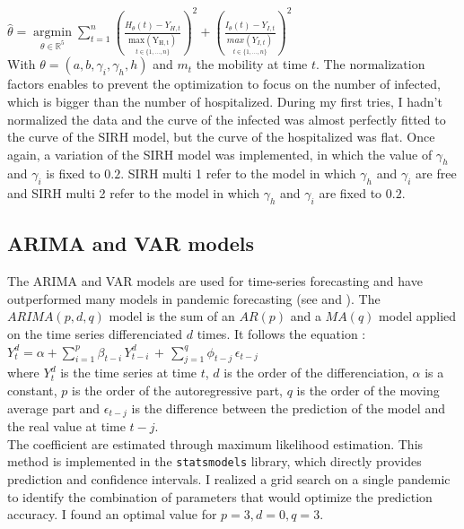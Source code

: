 $\hat{\theta} = \underset{\theta \in \mathbb{R}^5}{\operatorname{argmin}} \sum_{t=1}^{n} (\frac{H_\theta(t) - Y_{H, t}}{\underset{t \in \{1, ..., n \}}{\operatorname{max(Y_{H, t})}}})^2 + (\frac{I_\theta(t) - Y_{I, t}}{\underset{t \in \{1, ..., n \}}{max(Y_{I, t})}})^2$\\

With $\theta = (a, b, \gamma_i, \gamma_h, h)$ and $m_t$ the mobility at time $t$.
The normalization factors enables to prevent the optimization to focus on the number of infected, which is bigger than the number of hospitalized. 
During my first tries, I hadn't normalized the data and the curve of the infected was almost perfectly fitted to the curve of the SIRH model, but the curve of the hospitalized was flat. 
Once again, a variation of the SIRH model was implemented, in which the value of $\gamma_h$ and $\gamma_i$ is fixed to $0.2$. 
SIRH multi 1 refer to the model in which $\gamma_h$ and $\gamma_i$ are free and SIRH multi 2 refer to the model in which $\gamma_h$ and $\gamma_i$ are fixed to $0.2$.



\subsection{ARIMA and VAR models} 

The ARIMA and VAR models are used for time-series forecasting and have outperformed many models in pandemic forecasting (see \cite{kufel2020arima} and \cite{shang2021regional}).
The $ARIMA(p, d, q)$ model is the sum of an $AR(p)$ and a $MA(q)$ model applied on the time series differenciated $d$ times. 
It follows the equation : \\
$Y_{t}^{d}=\alpha+\sum_{i=1}^{p}\beta_{t-i}\,Y_{t-i}^{d}\,+\,\sum_{j=1}^{q}\phi_{t-j}\,\epsilon_{t-j} \label{eq:arima}$\\ 
where $Y_{t}^{d}$ is the time series at time $t$, $d$ is the order of the differenciation, $\alpha$ is a constant, $p$ is the order of the autoregressive part, $q$ is the order of the moving average part and $\epsilon_{t-j}$ is the difference between the prediction of the model and the real value at time $t-j$.\\
The coefficient are estimated through maximum likelihood estimation. 
This method is implemented in the \texttt{statsmodels} library, which directly provides prediction and confidence intervals.
I realized a grid search on a single pandemic to identify the combination of parameters that would optimize the prediction accuracy. 
I found an optimal value for $p= 3, d=0, q=3$. 

